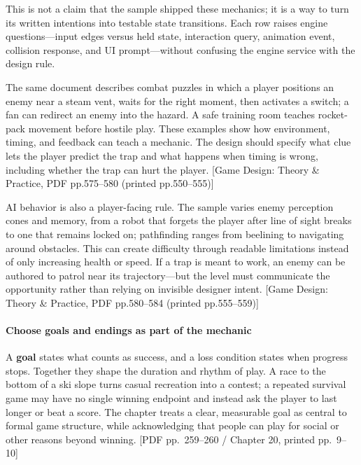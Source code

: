 This is not a claim that the sample shipped these mechanics; it is a way to turn its written intentions into testable state transitions. Each row raises engine questions---input edges versus held state, interaction query, animation event, collision response, and UI prompt---without confusing the engine service with the design rule.

The same document describes combat puzzles in which a player positions an enemy near a steam vent, waits for the right moment, then activates a switch; a fan can redirect an enemy into the hazard. A safe training room teaches rocket-pack movement before hostile play. These examples show how environment, timing, and feedback can teach a mechanic. The design should specify what clue lets the player predict the trap and what happens when timing is wrong, including whether the trap can hurt the player. {[}Game Design: Theory \& Practice, PDF pp.575--580 (printed pp.550--555){]}

AI behavior is also a player-facing rule. The sample varies enemy perception cones and memory, from a robot that forgets the player after line of sight breaks to one that remains locked on; pathfinding ranges from beelining to navigating around obstacles. This can create difficulty through readable limitations instead of only increasing health or speed. If a trap is meant to work, an enemy can be authored to patrol near its trajectory---but the level must communicate the opportunity rather than relying on invisible designer intent. {[}Game Design: Theory \& Practice, PDF pp.580--584 (printed pp.555--559){]}

\paragraph{Choose goals and endings as part of the mechanic}\label{05-engine-i-ch009-choose-goals-and-endings-as-part-of-the-mechanic}

\hypertarget{05-engine-i-ch009-choose-goals-and-endings-as-part-of-the-mechanic}{}

A \textbf{goal} states what counts as success, and a loss condition states when progress stops. Together they shape the duration and rhythm of play. A race to the bottom of a ski slope turns casual recreation into a contest; a repeated survival game may have no single winning endpoint and instead ask the player to last longer or beat a score. The chapter treats a clear, measurable goal as central to formal game structure, while acknowledging that people can play for social or other reasons beyond winning. {[}PDF pp.~259--260 / Chapter 20, printed pp.~9--10{]}

